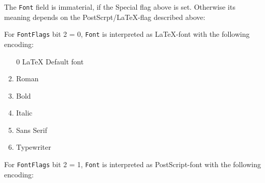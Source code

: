 \documentclass[10pt, a4paper]{article}
\begin{document}
The {\tt Font} field is immaterial, if the Special flag above is set. 
Otherwise its meaning depends on the PostScrpt/\LaTeX-flag 
described above: 

For {\tt FontFlags} bit 2 = 0, 
{\tt Font} is interpreted as \LaTeX-font with the following encoding: 
%
\begin{enumerate}
\item[0] \LaTeX{} Default font
\item    Roman
\item    Bold
\item    Italic
\item    Sans Serif
\item    Typewriter
\end{enumerate}

For {\tt FontFlags} bit 2 = 1, 
{\tt Font} is interpreted as PostScript-font with the following encoding: 
\end{document}
